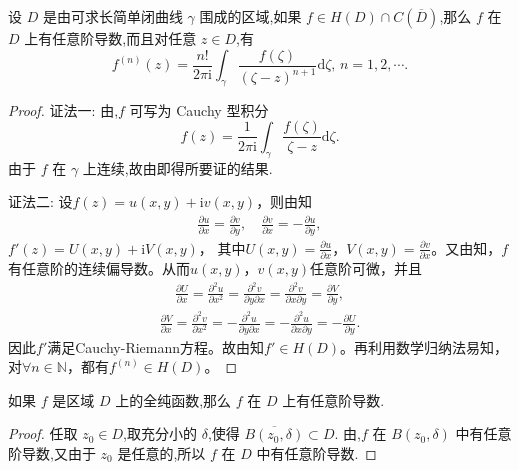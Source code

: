 \documentclass[../../main.tex]{subfiles}%
\begin{document}
\begin{theorem}\label{theorem:定理3.4.3}
设 \( D \) 是由可求长简单闭曲线 \( \gamma \) 围成的区域,如果 \( f \in H(D) \cap C(\overline{D}) \),那么 \( f \) 在 \( D \) 上有任意阶导数,而且对任意 \( z \in D \),有
\[
f^{(n)}(z) = \frac{n!}{2\pi \mathrm{i}} \int_{\gamma} \frac{f(\zeta)}{(\zeta - z)^{n + 1}} \mathrm{d}\zeta, \, n = 1, 2, \cdots.
\]
\end{theorem}
\begin{proof}

{\color{blue}证法一:}
由,\( f \) 可写为 Cauchy 型积分
\[
f(z) = \frac{1}{2\pi \mathrm{i}} \int_{\gamma} \frac{f(\zeta)}{\zeta - z} \mathrm{d}\zeta.
\]
由于 \( f \) 在 \( \gamma \) 上连续,故由即得所要证的结果. 

{\color{blue}证法二:}
设\( f(z) = u(x,y) + \mathrm{i}v(x,y) \)，则由知
\begin{align*}
\frac{\partial u}{\partial x} = \frac{\partial v}{\partial y},\quad \frac{\partial v}{\partial x} = -\frac{\partial u}{\partial y},
\end{align*}
\( f'(z) = U(x,y) + \mathrm{i}V(x,y) \)，
其中\( U(x,y) = \frac{\partial u}{\partial x} \)，\( V(x,y) = \frac{\partial v}{\partial x} \)。又由知，\( f \)有任意阶的连续偏导数。从而\( u(x,y) \)，\( v(x,y) \)任意阶可微，并且
\begin{align*}
\frac{\partial U}{\partial x} = \frac{\partial^2 u}{\partial x^2} = \frac{\partial^2 v}{\partial y \partial x} = \frac{\partial^2 v}{\partial x \partial y} = \frac{\partial V}{\partial y},
\end{align*}
\begin{align*}
\frac{\partial V}{\partial x} = \frac{\partial^2 v}{\partial x^2} = -\frac{\partial^2 u}{\partial y \partial x} = -\frac{\partial^2 u}{\partial x \partial y} = -\frac{\partial U}{\partial y}.
\end{align*}
因此\( f' \)满足Cauchy-Riemann方程。故由知\( f' \in H(D) \)。再利用数学归纳法易知，对\( \forall n \in \mathbb{N} \)，都有\( f^{(n)} \in H(D) \)。
\end{proof}

\begin{theorem}\label{theorem:定理3.4.4}
如果 \( f \) 是区域 \( D \) 上的全纯函数,那么 \( f \) 在 \( D \) 上有任意阶导数.
\end{theorem}
\begin{proof}
任取 \( z_0 \in D \),取充分小的 \( \delta \),使得 \( \overline{B(z_0, \delta)} \subset D \). 由,\( f \) 在 \( B(z_0, \delta) \) 中有任意阶导数,又由于 \( z_0 \) 是任意的,所以 \( f \) 在 \( D \) 中有任意阶导数.
\end{proof}
\end{document}
